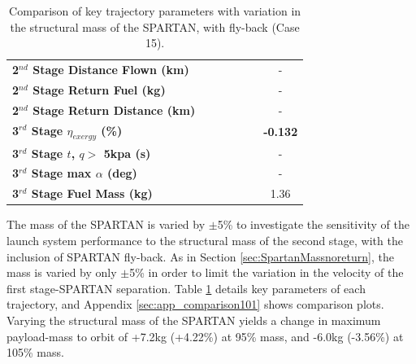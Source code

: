 \begin{table}[ht]
\begin{tabular}{l c c c c c c}
	\textbf{2$^{nd}$ Stage Distance Flown (km)}
	& \SecondDistmSPARTANNinetyFive
	& \SecondDistmSPARTANNinetySevenFive
	& \SecondDistmSPARTANStandard
	& \SecondDistmSPARTANOneHundredTwoFive
	& \SecondDistmSPARTANOneHundredFive
	& -
	\\
	\textbf{2$^{nd}$ Stage Return Fuel (kg)}
	& \returnFuelmSPARTANNinetyFive
	& \returnFuelmSPARTANNinetySevenFive
	& \returnFuelmSPARTANStandard
	& \returnFuelmSPARTANOneHundredTwoFive
	& \returnFuelmSPARTANOneHundredFive
	& -
	\\
	\textbf{2$^{nd}$ Stage Return Distance (km)}
	& \returnDistmSPARTANNinetyFive
	& \returnDistmSPARTANNinetySevenFive
	& \returnDistmSPARTANStandard
	& \returnDistmSPARTANOneHundredTwoFive
	& \returnDistmSPARTANOneHundredFive
	& -
	\\
	\hline 
	\textbf{3$^{rd}$ Stage $\eta_{exergy}$ (\%)}
	& \textbf{\thirddExergyEffmSPARTANNinetyFive}
	& \textbf{\thirddExergyEffmSPARTANNinetySevenFive}
	& \textbf{\thirddExergyEffmSPARTANStandard}
	& \textbf{\thirddExergyEffmSPARTANOneHundredTwoFive}
	& \textbf{\thirddExergyEffmSPARTANOneHundredFive}
	& \textbf{-0.132}
	\\
	\textbf{3$^{rd}$ Stage $t$, $q >$ 5kpa (s)}
	& \thirdqOverFivemSPARTANNinetyFive
	& \thirdqOverFivemSPARTANNinetySevenFive
	& \thirdqOverFivemSPARTANStandard
	& \thirdqOverFivemSPARTANOneHundredTwoFive
	& \thirdqOverFivemSPARTANOneHundredFive
	& -
	\\
	\textbf{3$^{rd}$ Stage max $\alpha$ (deg)}
	& \thirdmaxAoAmSPARTANNinetyFive
	& \thirdmaxAoAmSPARTANNinetySevenFive
	& \thirdmaxAoAmSPARTANStandard
	& \thirdmaxAoAmSPARTANOneHundredTwoFive
	& \thirdmaxAoAmSPARTANOneHundredFive
	& -
	\\
	\textbf{3$^{rd}$ Stage Fuel Mass (kg)}
	& \thirdmFuelmSPARTANNinetyFive
	& \thirdmFuelmSPARTANNinetySevenFive
	& \thirdmFuelmSPARTANStandard
	& \thirdmFuelmSPARTANOneHundredTwoFive
	& \thirdmFuelmSPARTANOneHundredFive
	&1.36
	\\
	\hline 
\end{tabular} 
\caption{Comparison of key trajectory parameters with variation in the structural mass of the SPARTAN, with fly-back (Case 15).}
\label{tab:comparison101}
\end{table}


The mass of the SPARTAN is varied by $\pm$5\% to investigate the sensitivity of the launch system performance to the structural mass of the second stage, with the inclusion of SPARTAN fly-back. As in Section \ref{sec:SpartanMassnoreturn}, the mass is varied by only $\pm$5\% in order to limit the variation in the velocity of the first stage-SPARTAN separation.
Table \ref{tab:comparison101} details key parameters of each trajectory, and Appendix \ref{sec:app_comparison101} shows comparison plots.
Varying the structural mass of the SPARTAN yields a change in maximum payload-mass to orbit of +7.2kg (+4.22\%) at 95\% mass, and -6.0kg (-3.56\%) at 105\% mass. 

